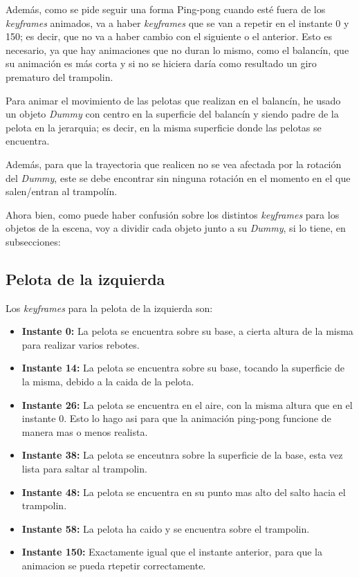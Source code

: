 \documentclass{article}
\begin{document}
Además, como se pide seguir una forma Ping-pong cuando esté fuera de los \textit{keyframes} animados, va a haber \textit{keyframes} que se van a repetir en el instante 0 y 150; es decir, que no va a haber cambio con el siguiente o el anterior. Esto es necesario, ya que hay animaciones que no duran lo mismo, como el balancín, que su animación es más corta y si no se hiciera daría como resultado un giro prematuro del trampolin.

\bigskip

Para animar el movimiento de las pelotas que realizan en el balancín, he usado un objeto \textit{Dummy} con centro en la superficie del balancín y siendo padre de la pelota en la jerarquia; es decir, en la misma superficie donde las pelotas se encuentra.

Además, para que la trayectoria que realicen no se vea afectada por la rotación del \textit{Dummy}, este se debe encontrar sin ninguna rotación en el momento en el que salen/entran al trampolín.

\bigskip

Ahora bien, como puede haber confusión sobre los distintos \textit{keyframes} para los objetos de la escena, voy a dividir cada objeto junto a su \textit{Dummy}, si lo tiene, en subsecciones:

\subsection{Pelota de la izquierda}

Los \textit{keyframes} para la pelota de la izquierda son:

\begin{itemize}
    \item \textbf{Instante 0: }La pelota se encuentra sobre su base, a cierta altura de la misma para realizar varios rebotes.
    \item \textbf{Instante 14: }La pelota se encuentra sobre su base, tocando la superficie de la misma, debido a la caida de la pelota.
    \item \textbf{Instante 26: }La pelota se encuentra en el aire, con la misma altura que en el instante 0. Esto lo hago asi para que la animación ping-pong funcione de manera mas o menos realista.
    \item \textbf{Instante 38: }La pelota se enceutnra sobre la superficie de la base, esta vez lista para saltar al trampolin.
    \item \textbf{Instante 48: }La pelota se encuentra en su punto mas alto del salto hacia el trampolin.
    \item \textbf{Instante 58: }La pelota ha caido y se encuentra sobre el trampolin.
    \item \textbf{Instante 150: }Exactamente igual que el instante anterior, para que la animacion se pueda rtepetir correctamente.
\end{itemize}
\end{document}
